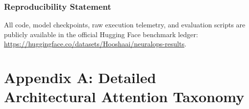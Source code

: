 \documentclass{article}
\begin{document}
\subsubsection*{Reproducibility Statement}
All code, model checkpoints, raw execution telemetry, and evaluation scripts are publicly available in the official Hugging Face benchmark ledger: \url{https://huggingface.co/datasets/Hooshaai/neuralops-results}.




\newpage
\appendix
\section{Appendix A: Detailed Architectural Attention Taxonomy}
\label{sec:appendix_taxonomy}
\end{document}

